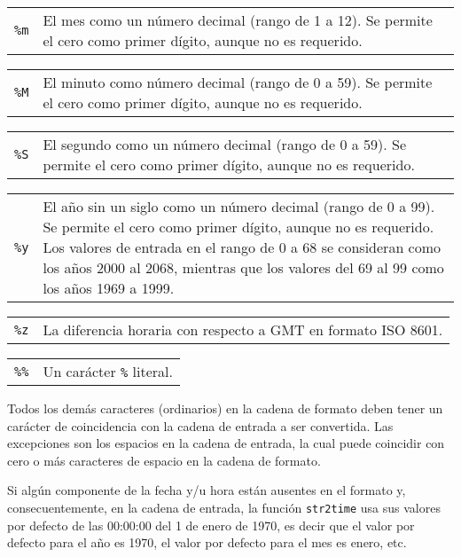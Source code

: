 \documentclass[11pt,spanish]{report}
\begin{document}
\begin{tabular}{@{}p{20pt}p{421.5pt}@{}}
{\tt\%m}&El mes como un número decimal (rango de 1 a 12). Se permite el cero como primer dígito, aunque no es requerido.\\
\end{tabular}

\begin{tabular}{@{}p{20pt}p{421.5pt}@{}}
{\tt\%M}&El minuto como número decimal (rango de 0 a 59). Se permite el cero como primer dígito, aunque no es requerido.\\
\end{tabular}

\begin{tabular}{@{}p{20pt}p{421.5pt}@{}}
{\tt\%S}&El segundo como un número decimal (rango de 0 a 59). Se permite el cero como primer dígito, aunque no es requerido.\\
\end{tabular}

\begin{tabular}{@{}p{20pt}p{421.5pt}@{}}
{\tt\%y}&El año sin un siglo como un número decimal (rango de 0 a 99). Se permite el cero como primer dígito, aunque no es requerido. Los valores de entrada en el rango de 0 a 68 se consideran como los años 2000 al 2068, mientras que los valores del 69 al 99 como los años 1969 a 1999.\\
\end{tabular}

\begin{tabular}{@{}p{20pt}p{421.5pt}@{}}
{\tt\%z}&La diferencia horaria con respecto a GMT en formato ISO 8601.\\
\end{tabular}

\begin{tabular}{@{}p{20pt}p{421.5pt}@{}}
{\tt\%\%}&Un carácter {\tt\%} literal.\\
\end{tabular}

Todos los demás caracteres (ordinarios) en la cadena de formato deben tener un carácter de coincidencia con la cadena de entrada a ser convertida. Las excepciones son los espacios en la cadena de entrada, la cual puede coincidir con cero o más caracteres de espacio en la cadena de formato.

Si algún componente de la fecha y/u hora están ausentes en el formato y, consecuentemente, en la cadena de entrada, la función {\tt str2time} usa sus valores por defecto de las 00:00:00 del 1 de enero de 1970, es decir que el valor por defecto para el año es 1970, el valor por defecto para el mes es enero, etc.
\end{document}
